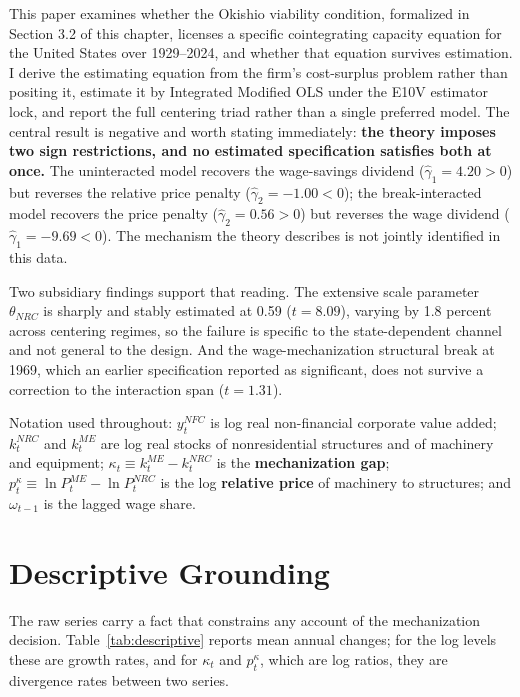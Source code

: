 \documentclass[11pt,a4paper]{article}
\begin{document}
This paper examines whether the Okishio viability condition, formalized in Section 3.2 of this chapter, licenses a specific cointegrating capacity equation for the United States over 1929--2024, and whether that equation survives estimation. I derive the estimating equation from the firm's cost-surplus problem rather than positing it, estimate it by Integrated Modified OLS under the E10V estimator lock, and report the full centering triad rather than a single preferred model. The central result is negative and worth stating immediately: \textbf{the theory imposes two sign restrictions, and no estimated specification satisfies both at once.} The uninteracted model recovers the wage-savings dividend ($\hat{\gamma}_1 = 4.20 > 0$) but reverses the relative price penalty ($\hat{\gamma}_2 = -1.00 < 0$); the break-interacted model recovers the price penalty ($\hat{\gamma}_2 = 0.56 > 0$) but reverses the wage dividend ($\hat{\gamma}_1 = -9.69 < 0$). The mechanism the theory describes is not jointly identified in this data.

Two subsidiary findings support that reading. The extensive scale parameter $\theta_{NRC}$ is sharply and stably estimated at 0.59 ($t = 8.09$), varying by 1.8 percent across centering regimes, so the failure is specific to the state-dependent channel and not general to the design. And the wage-mechanization structural break at 1969, which an earlier specification reported as significant, does not survive a correction to the interaction span ($t = 1.31$).

Notation used throughout: $y^{NFC}_t$ is log real non-financial corporate value added; $k^{NRC}_t$ and $k^{ME}_t$ are log real stocks of nonresidential structures and of machinery and equipment; $\kappa_t \equiv k^{ME}_t - k^{NRC}_t$ is the \textbf{mechanization gap}; $p^{\kappa}_t \equiv \ln P^{ME}_t - \ln P^{NRC}_t$ is the log \textbf{relative price} of machinery to structures; and $\omega_{t-1}$ is the lagged wage share.

\FloatBarrier
\section{Descriptive Grounding}

The raw series carry a fact that constrains any account of the mechanization decision. Table~\ref{tab:descriptive} reports mean annual changes; for the log levels these are growth rates, and for $\kappa_t$ and $p^{\kappa}_t$, which are log ratios, they are divergence rates between two series.
\end{document}
